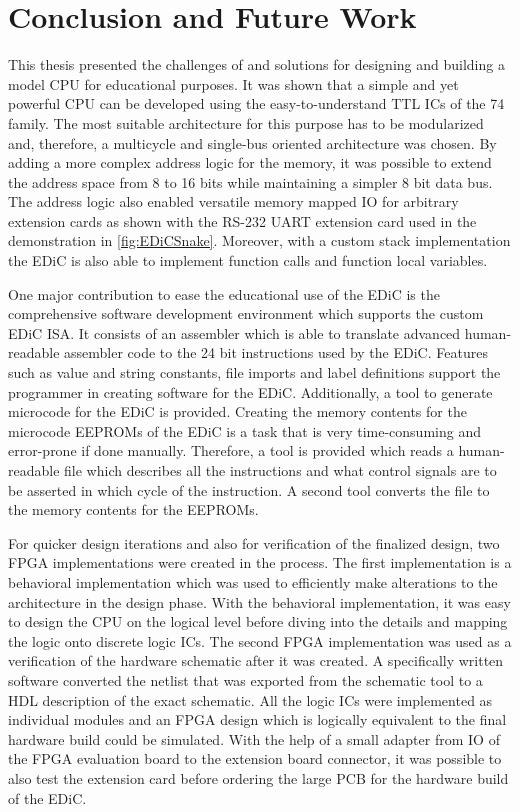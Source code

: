 
\chapter{Conclusion and Future Work}\label{cha:conclusion}
This thesis presented the challenges of and solutions for designing and building a model \gls{CPU} for educational purposes.
It was shown that a simple and yet powerful \gls{CPU} can be developed using the easy-to-understand \gls{TTL} \glspl{IC} of the 74 family.
The most suitable architecture for this purpose has to be modularized and, therefore, a multicycle and single-bus oriented architecture was chosen.
By adding a more complex address logic for the memory, it was possible to extend the address space from 8 to 16 bits while maintaining a simpler 8 bit data bus.
The address logic also enabled versatile memory mapped \gls{IO} for arbitrary extension cards as shown with the RS-232 \gls{UART} extension card used in the demonstration in \cref{fig:EDiCSnake}.
Moreover, with a custom stack implementation the \gls{EDiC} is also able to implement function calls and function local variables.

One major contribution to ease the educational use of the \gls{EDiC} is the comprehensive software development environment which supports the custom \gls{EDiC} \gls{ISA}.
It consists of an assembler which is able to translate advanced human-readable assembler code to the 24 bit instructions used by the \gls{EDiC}.
Features such as value and string constants, file imports and label definitions support the programmer in creating software for the \gls{EDiC}.
Additionally, a tool to generate microcode for the \gls{EDiC} is provided.
Creating the memory contents for the microcode \glspl{EEPROM} of the \gls{EDiC} is a task that is very time-consuming and error-prone if done manually.
Therefore, a tool is provided which reads a human-readable file which describes all the instructions and what control signals are to be asserted in which cycle of the instruction.
A second tool converts the file to the memory contents for the \glspl{EEPROM}.

For quicker design iterations and also for verification of the finalized design, two \gls{FPGA} implementations were created in the process.
The first implementation is a behavioral implementation which was used to efficiently make alterations to the architecture in the design phase.
With the behavioral implementation, it was easy to design the \gls{CPU} on the logical level before diving into the details and mapping the logic onto discrete logic \glspl{IC}.
The second \gls{FPGA} implementation was used as a verification of the hardware schematic after it was created.
A specifically written software converted the netlist that was exported from the schematic tool to a \gls{HDL} description of the exact schematic.
All the logic \glspl{IC} were implemented as individual modules and an \gls{FPGA} design which is logically equivalent to the final hardware build could be simulated.
With the help of a small adapter from \gls{IO} of the \gls{FPGA} evaluation board to the extension board connector, it was possible to also test the extension card before ordering the large \gls{PCB} for the hardware build of the \gls{EDiC}.

